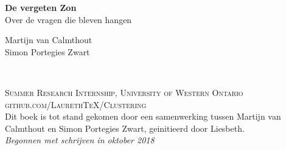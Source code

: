 \documentclass[11pt,fleqn]{book} %
\begin{document}

\begingroup
\thispagestyle{empty}
\centering
\vspace*{5cm}
\par\normalfont\fontsize{35}{35}\sffamily\selectfont
\textbf{De vergeten Zon}\\
{\LARGE Over de vragen die bleven hangen}\par %
\vspace*{1cm}
{\Huge Martijn van Calmthout \\
       Simon Portegies Zwart}\par %
\endgroup


\newpage
~\vfill
\thispagestyle{empty}


\noindent \textsc{Summer Research Internship, University of Western Ontario}\\

\noindent \textsc{github.com/LaurethTeX/Clustering}\\ %

\noindent Dit boek is tot stand gekomen door een samenwerking tussen Martijn van Calmthout en Simon Portegies Zwart, geinitieerd door Liesbeth.\\ %

\noindent \textit{Begonnen met schrijven in oktober 2018} %



\pagestyle{empty} %

\tableofcontents %
\end{document}
